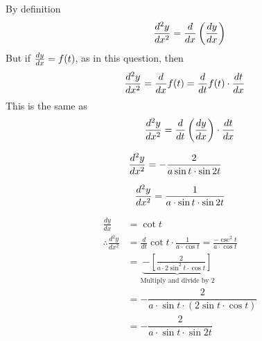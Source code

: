 \documentclass[14pt,fleqn]{extarticle}
\begin{document}
\newcard 

By definition \[ \qquad \frac{d^2 y}{dx^2} = \frac{d}{dx} \left(\frac{dy}{dx} \right)\]
But if $\frac{dy}{dx} = f(t)$, as in this question, then 
\[ \quad \frac{d^2 y}{dx^2} = \frac{d}{dx} f(t) = \frac{d}{dt} f(t)\cdot \frac{dt}{dx}\]
This is the same as 
\[ \qquad \frac{d^2 y}{dx^2} = \frac{d}{dt} \left(\frac{dy}{dx} \right)\cdot \frac{dt}{dx} \]

\newcard 

\begin{align}
	\frac{d^2 y}{dx^2} &= -\frac{2}{a\sin t \cdot \sin 2t}
\end{align}

\newcard

\[\frac{d^2 y}{dx^2} = \dfrac{1}{a\cdot\sin t\cdot \sin 2t} \]

\newcard

\begin{align}
\frac{dy}{dx} &= \cot t \\
\therefore \frac{d^2 y}{dx^2} &= \frac{d}{dt}\cot t\cdot\frac{1}{a\cdot\cos t} = \frac{-\csc^2 t}{a\cdot \cos t} \\
&= \underbrace{-\left[ \frac{2}{a\cdot 2\sin^2 t\cdot\cos t}\right] }_{\text{Multiply and divide by 2}} \\
&= -\dfrac{2}{a\cdot\sin t\cdot (2\sin t\cdot \cos t)} \\ 
&= -\dfrac{2}{a\cdot\sin t\cdot \sin 2t}
\end{align}
\end{document}
